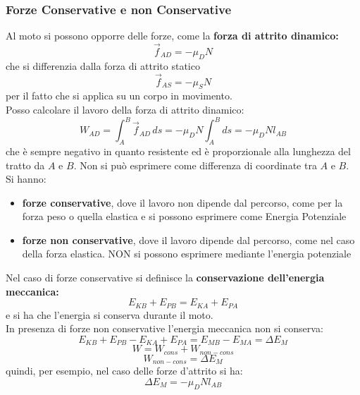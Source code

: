 \documentclass[a4paper,12pt, oneside]{book}
\begin{document}
\subsubsection{Forze Conservative e non Conservative}
Al moto si possono opporre delle forze, come la \textbf{forza di attrito dinamico:}
$$\vec{f}_{AD}=-\mu_DN$$
che si differenzia dalla forza di attrito statico
$$\vec{f}_{AS}=-\mu_SN$$
per il fatto che si applica su un corpo in movimento.\\
Posso calcolare il lavoro della forza di attrito dinamico:
$$W_{AD}=\int_A^B\vec{f}_{AD}\,ds=-\mu_DN\int_A^Bds=-\mu_DNl_{AB}$$
che è sempre negativo in quanto resistente ed è proporzionale alla lunghezza del tratto da $A$ e $B$. Non si può esprimere come differenza di coordinate tra $A$ e $B$.\\
Si hanno:
\begin{itemize}
\item \textbf{forze conservative}, dove il lavoro non dipende dal percorso, come per la forza peso o quella elastica e si possono esprimere come Energia Potenziale
\item \textbf{forze non conservative}, dove il lavoro dipende dal percorso, come nel caso della forza elastica. NON si possono esprimere mediante l'energia potenziale
\end{itemize}
Nel caso di forze conservative si definisce la \textbf{conservazione dell'energia meccanica:}
$$E_{KB}+E_{PB}=E_{KA}+E_{PA}$$
e si ha che l'energia si conserva durante il moto.\\
In presenza di forze non conservative l'energia meccanica non si conserva:
$$E_{KB}+E_{PB}-E_{KA}+E_{PA}=E_{MB}-E_{MA}=\Delta E_M$$
$$W=W_{cons}+W_{non-cons}$$
$$W_{non-cons}=\Delta E_M$$
quindi, per esempio, nel caso delle forze d'attrito si ha:
$$\Delta E_M=-\mu_DNl_{AB}$$
\end{document}
